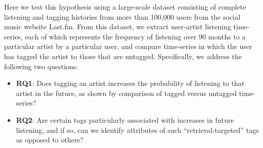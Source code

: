 Here we test this hypothesis using a large-scale dataset consisting of complete listening and tagging histories from more than 100,000 users from the social music website Last.fm. From this dataset, we extract user-artist listening time-series, each of which represents the frequency of listening over 90 months to a particular artist by a particular user, and compare time-series in which the user has tagged the artist to those that are untagged. Specifically, we address the following two questions:
\begin{itemize}
	\item {\bf RQ1}: Does tagging an artist increases the probability of listening to that artist in the future, as shown by comparison of tagged versus untagged time-series?
	\item {\bf RQ2}: Are certain tags particularly associated with increases in future listening, and if so, can we identify attributes of such ``retrieval-targeted'' tags as opposed to others?
\end{itemize}

